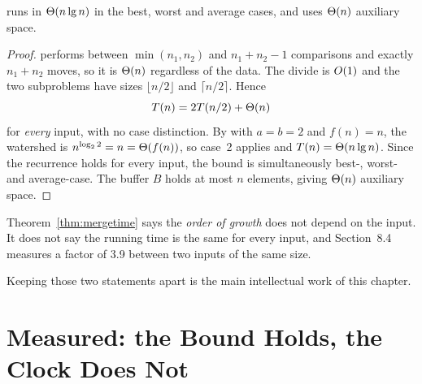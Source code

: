 \begin{theorem}\label{thm:mergetime}
 runs in $\Theta(n \operatorname{lg} n)$ in the best, worst and average
cases, and uses $\Theta(n)$ auxiliary space.
\end{theorem}

\begin{proof}
 performs between $\min(n_{1},n_{2})$ and $n_{1}+n_{2}-1$
comparisons and exactly $n_{1}+n_{2}$ moves, so it is $\Theta(n)$ regardless of
the data. The divide is $O(1)$ and the two subproblems have sizes
$\lfloor n/2 \rfloor$ and $\lceil n/2 \rceil$. Hence
\[ T(n) = 2T(n/2) + \Theta(n) \]
for \emph{every} input, with no case distinction. By  with
$a = b = 2$ and $f(n) = n$, the watershed is $n^{\log_{2}2} = n = \Theta(f(n))$,
so case~2 applies and $T(n) = \Theta(n \operatorname{lg} n)$. Since the recurrence holds for
every input, the bound is simultaneously best-, worst- and average-case. The
buffer $B$ holds at most $n$ elements, giving $\Theta(n)$ auxiliary space.
\end{proof}

\begin{alertbox}
Theorem~\ref{thm:mergetime} says the \emph{order of growth} does not depend on
the input. It does not say the running time is the same for every input, and
Section~8.4 measures a factor of 3.9 between two inputs of the same size.

\smallskip
Keeping those two statements apart is the main intellectual work of this
chapter.
\end{alertbox}

\section{Measured: the Bound Holds, the Clock Does Not}


